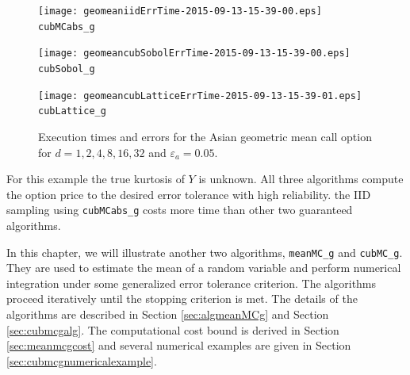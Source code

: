 \documentclass{iitthesis}
\theoremstyle{definition}
\begin{document}
\begin{figure}
\centering
\begin{minipage}{9cm} \centering \texttt{[image: geomeaniidErrTime-2015-09-13-15-39-00.eps]} \\ {\tt cubMCabs\_g} \end{minipage}
\begin{minipage}{7cm} \centering \texttt{[image: geomeancubSobolErrTime-2015-09-13-15-39-00.eps]} \\ {\tt cubSobol\_g} \end{minipage}
\begin{minipage}{7cm} \centering \texttt{[image: geomeancubLatticeErrTime-2015-09-13-15-39-01.eps]} \\ {\tt cubLattice\_g} \end{minipage}
\caption{Execution times and errors for the Asian geometric mean call option for $d=1, 2, 4, 8, 16, 32$ and $\varepsilon_a=0.05$.\label{fig:GeoMeanAsianOptionabstol}}
\end{figure}

For this example the true kurtosis of $Y$ is unknown.  
All three algorithms compute the option price to the desired error tolerance with high reliability.  the IID sampling using {\tt cubMCabs\_g} costs more time than other two guaranteed algorithms.


 \label{chapter:meanMCg}

In this chapter, we will illustrate another two algorithms, {\tt meanMC\_g} and {\tt cubMC\_g}. They are used to estimate the mean of a random variable and perform numerical integration under some generalized error tolerance criterion. The algorithms proceed iteratively until the stopping criterion is met. The details of the algorithms are described in Section \ref{sec:algmeanMCg} and Section \ref{sec:cubmcgalg}. The computational cost bound is derived in Section \ref{sec:meanmcgcost} and several numerical examples are given in Section \ref{sec:cubmcgnumericalexample}.

\label{sec:generalerrorcriterion}
\end{document}
